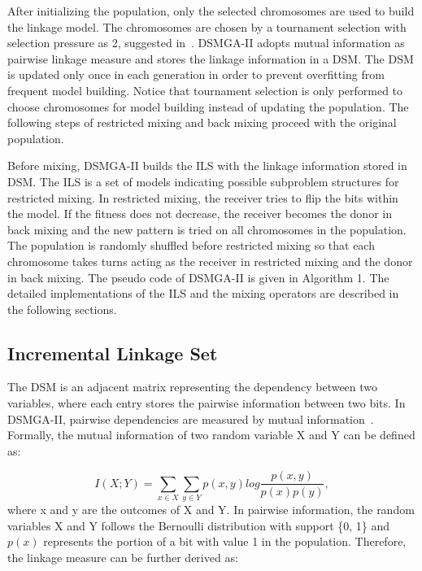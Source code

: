 \documentclass{sig-alternate-05-2015}
\begin{document}
After initializing the population, only the selected chromosomes are used to build the linkage model. The chromosomes are chosen by a tournament selection with selection pressure as 2, suggested in~\cite{yu:population}. DSMGA-II adopts mutual information as pairwise linkage measure and stores the linkage information in a DSM. The DSM is updated only once in each generation in order to prevent overfitting from frequent model building. Notice that tournament selection is only performed to choose chromosomes for model building instead of updating the population. The following steps of restricted mixing and back mixing proceed with the original population.


Before mixing, DSMGA-II builds the ILS with the linkage information stored in DSM. The ILS is a set of models indicating possible subproblem structures for restricted mixing. In restricted mixing, the receiver tries to flip the bits within the model. If the fitness does not decrease, the receiver becomes the donor in back mixing and the new pattern is tried on all chromosomes in the population. The population is randomly shuffled before restricted mixing so that each chromosome takes turns acting as the receiver in restricted mixing and the donor in back mixing. The pseudo code of DSMGA-II is given in Algorithm 1. The detailed implementations of the ILS and the mixing operators are described in the following sections. 



\subsection{Incremental Linkage Set}
The DSM is an adjacent matrix representing the dependency between two variables, where each entry stores the pairwise information between two bits. In DSMGA-II, pairwise dependencies are measured by mutual information~\cite{kullback:KL-diversion}. Formally, the mutual information of two random variable X and Y can be defined as:

\begin{displaymath} 
I(X;Y) = \sum_{x \in X}\sum_{y \in Y} p(x,y)  log \frac{p(x,y)}{p(x) p(y)}, 
\end{displaymath}
where x and y are the outcomes of X and Y. In pairwise information, the random variables X and Y follows the Bernoulli distribution with support \{0, 1\} and $p(x)$ represents the portion of a bit with value 1 in the population. Therefore, the linkage measure can be further derived as:
\end{document}
